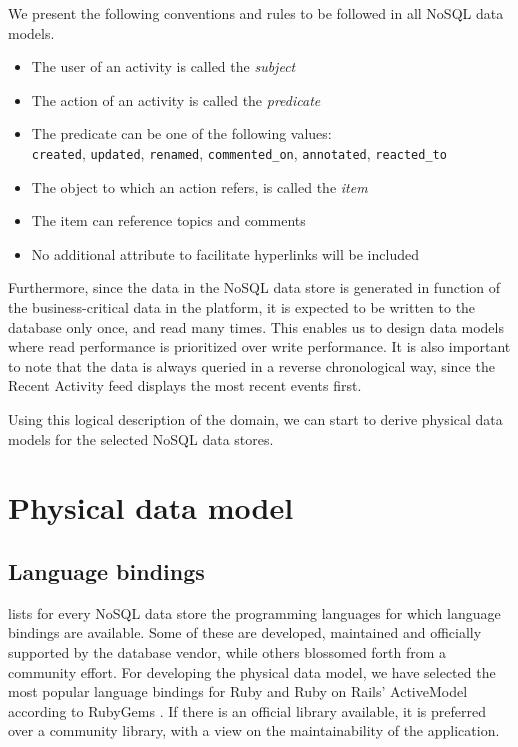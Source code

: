 We present the following conventions and rules to be followed in all NoSQL data models.

\begin{itemize}
  \item The user of an activity is called the \textit{subject}
  \item The action of an activity is called the \textit{predicate}
  \item The predicate can be one of the following values:\\ \texttt{created}, \texttt{updated}, \texttt{renamed}, \texttt{commented\_on}, \texttt{annotated}, \texttt{reacted\_to}
  \item The object to which an action refers, is called the \textit{item}
  \item The item can reference topics and comments
  \item No additional attribute to facilitate hyperlinks will be included
\end{itemize}

Furthermore, since the data in the NoSQL data store is generated in function of the business-critical data in the platform, it is expected to be written to the database only once, and read many times.
This enables us to design data models where read performance is prioritized over write performance.
It is also important to note that the data is always queried in a reverse chronological way, since the Recent Activity feed displays the most recent events first.

Using this logical description of the domain, we can start to derive physical data models for the selected NoSQL data stores.

\section{Physical data model}
\label{sec:physical-data-model}

\subsection{Language bindings}
\label{subsec:language-bindings}

 lists for every NoSQL data store the programming languages for which language bindings are available.
Some of these are developed, maintained and officially supported by the database vendor, while others blossomed forth from a community effort.
For developing the physical data model, we have selected the most popular language bindings for Ruby and Ruby on Rails' ActiveModel according to RubyGems \autocite{RubyGems2003}.
If there is an official library available, it is preferred over a community library, with a view on the maintainability of the application.

